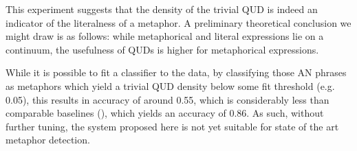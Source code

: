 \documentclass[10pt,letterpaper,twocolumn]{article}
\begin{document}
This experiment suggests that the density of the trivial QUD is indeed an indicator of the literalness of a metaphor. A preliminary theoretical conclusion we might draw is as follows: while metaphorical and literal expressions lie on a continuum, the usefulness of QUDs is higher for metaphorical expressions.

While it is possible to fit a classifier to the data, by classifying those AN phrases as metaphors which yield a trivial QUD density below some fit threshold (e.g. 0.05), this results in accuracy of around 0.55, which is considerably less than comparable baselines (\cite{tsvetkov2014metaphor}), which yields an accuracy of 0.86. As such, without further tuning, the system proposed here is not yet suitable for state of the art metaphor detection.










%
\end{document}
